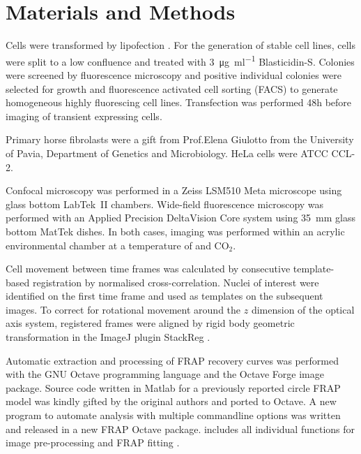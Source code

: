 \section{Materials and Methods}

  Cells were transformed by lipofection .
  For the generation of stable cell lines,
  cells were split to a low confluence and treated
  with \SI{3}{\ug\per\ml} Blasticidin-S.
  Colonies were screened by fluorescence microscopy
  and positive individual colonies were selected for growth
  and fluorescence activated cell sorting (FACS) to generate
  homogeneous highly fluorescing cell lines.
  Transfection was performed 48h before imaging of
  transient expressing cells.

  Primary horse fibrolasts were a gift from Prof.\@ Elena Giulotto
  from the University of Pavia, Department of Genetics and
  Microbiology.  HeLa cells were ATCC CCL-2.

  Confocal microscopy was performed in a Zeiss LSM510 Meta microscope
  using glass bottom LabTek~II chambers.  Wide-field fluorescence
  microscopy was performed with an Applied Precision DeltaVision Core
  system using \SI{35}{\mm} glass bottom MatTek dishes.  In both
  cases, imaging was performed within an acrylic environmental chamber
  at a temperature of  and  CO$_2$.


  Cell movement between time frames was calculated by consecutive
  template-based registration by normalised cross-correlation.
  Nuclei of interest were identified on the first time frame
  and used as templates on the subsequent images.
  To correct for rotational movement
  around the $z$ dimension of the optical axis system,
  registered frames were aligned by rigid body geometric transformation
  in the ImageJ \citep{imagej1} plugin StackReg \citep{stackreg}.

  Automatic extraction and processing of FRAP recovery curves was
  performed with the GNU Octave programming language \citep{octave}
  and the Octave Forge image package.  Source code written in Matlab
  for a previously reported circle FRAP model \citep{mcnally-frap-code}
  was kindly gifted by the original authors and ported to Octave.
  A new program to automate analysis with multiple commandline options
  was written and released in a new FRAP Octave package.
   includes all individual functions for image
  pre-processing and FRAP fitting .
